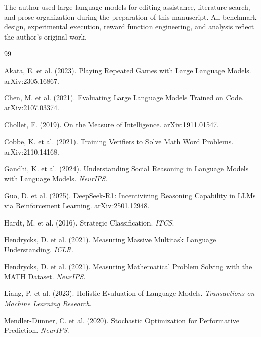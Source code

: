 \documentclass{article}
\begin{document}
The author used large language models for editing assistance, literature search, and prose organization during the preparation of this manuscript. All benchmark design, experimental execution, reward function engineering, and analysis reflect the author's original work.




\begin{thebibliography}{99}

Akata, E. et al. (2023).
Playing Repeated Games with Large Language Models.
arXiv:2305.16867.

Chen, M. et al. (2021).
Evaluating Large Language Models Trained on Code.
arXiv:2107.03374.

Chollet, F. (2019).
On the Measure of Intelligence.
arXiv:1911.01547.

Cobbe, K. et al. (2021).
Training Verifiers to Solve Math Word Problems.
arXiv:2110.14168.

Gandhi, K. et al. (2024).
Understanding Social Reasoning in Language Models with Language Models.
\textit{NeurIPS}.

Guo, D. et al. (2025).
DeepSeek-R1: Incentivizing Reasoning Capability in LLMs via Reinforcement Learning.
arXiv:2501.12948.

Hardt, M. et al. (2016).
Strategic Classification.
\textit{ITCS}.

Hendrycks, D. et al. (2021).
Measuring Massive Multitask Language Understanding.
\textit{ICLR}.

Hendrycks, D. et al. (2021).
Measuring Mathematical Problem Solving with the MATH Dataset.
\textit{NeurIPS}.

Liang, P. et al. (2023).
Holistic Evaluation of Language Models.
\textit{Transactions on Machine Learning Research}.

Mendler-D\"{u}nner, C. et al. (2020).
Stochastic Optimization for Performative Prediction.
\textit{NeurIPS}.


\end{thebibliography}
\end{document}

